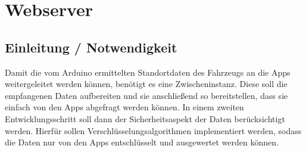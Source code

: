 \section{Webserver}
\subsection{Einleitung / Notwendigkeit}
Damit die vom Arduino ermittelten Standortdaten des Fahrzeugs an die Apps weitergeleitet werden können, benötigt es eine Zwischeninstanz. Diese soll die empfangenen Daten aufbereiten und sie anschließend so bereitstellen, dass sie einfach von den Apps abgefragt werden können.
In einem zweiten Entwicklungsschritt soll dann der Sicherheitsaspekt der Daten berücksichtigt werden. Hierfür sollen Verschlüsselungsalgorithmen implementiert werden, sodass die Daten nur von den Apps entschlüsselt und ausgewertet werden können.

